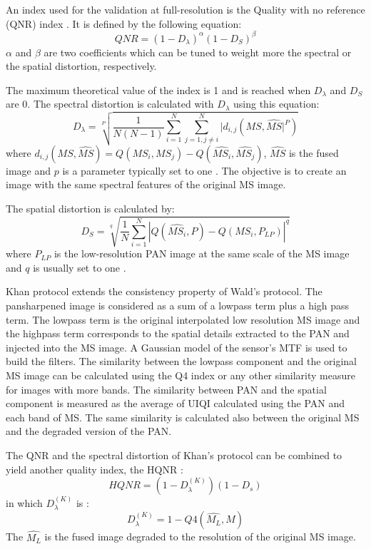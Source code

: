 \documentclass[12pt]{report}
\begin{document}
An index used for the validation at full-resolution is the Quality with no reference (QNR) index \cite{qnr}.
It is defined by the following equation:
%
\begin{equation}
    QNR = (1-D_{\lambda})^\alpha (1 - D_S)^\beta
    \label{qnr}
\end{equation}
%
$\alpha$ and $\beta$ are two coefficients which can be tuned to weight more
the spectral or the spatial distortion, respectively.

The maximum theoretical value of the index is 1 and is reached when $D_\lambda$ and $D_S$ are 0.
The spectral distortion is calculated with $D_\lambda$ using this equation:
%
\begin{equation}
    D_\lambda = \sqrt[P]{\frac{1}{N(N-1)} \sum_{i=1}^N \sum_{j=1, j \neq i}^N |d_{i,j}(MS, \widehat{MS}|^P)}
    \label{dl}
\end{equation}
%
where $d_{i,j}(MS, \widehat{MS}) = Q(MS_i, MS_j) - Q(\widehat{MS_i}, \widehat{MS_j})$, $\widehat{MS}$ is
the fused image and $p$ is a parameter typically set to one \cite{qnr}.
The objective is to create an image with the same spectral features of the original MS image.

The spatial distortion is calculated by:
%
\begin{equation}
    D_S = \sqrt[q]{\frac{1}{N} \sum_{i=1}^N |Q(\widehat{MS_i}, P) - Q(MS_i, P_{LP})|^q}
    \label{ds}
\end{equation}
%
where $P_{LP}$ is the low-resolution PAN image at the same scale of the MS image and $q$ is usually set to one \cite{qnr}.

Khan protocol \cite{khan} extends the consistency property of Wald's protocol.
The pansharpened image is considered as a sum of a lowpass term plus a high pass term.
The lowpass term is the original interpolated low resolution MS image and
the highpass term corresponds to the spatial details extracted to the PAN and injected into the MS image.
A Gaussian model of the sensor's MTF is used to build the filters. The similarity between the lowpass component and
the original MS image can be calculated using the Q4 index or any other similarity measure for images with more bands.
The similarity between PAN and the spatial component is measured as the average of UIQI calculated using the PAN and each band of MS.
The same similarity is calculated also between the original MS and the degraded version of the PAN.

The QNR and the spectral distortion of Khan's protocol can be combined to yield another quality index, the HQNR \cite{hqnr}:
%
\begin{equation}
    HQNR = (1 - D_\lambda^{(K)}) (1 - D_s) 
    \label{hqnr}
\end{equation}
%
in which $D_\lambda^{(K)}$ is :
%
\begin{equation}
    D_\lambda^{(K)} = 1 - Q4(\widehat{M_L}, M)
    \label{dlhqnr}
\end{equation}
%
The $ \widehat{M_L} $ is the fused image degraded to the resolution of the original MS image. 
\end{document}
